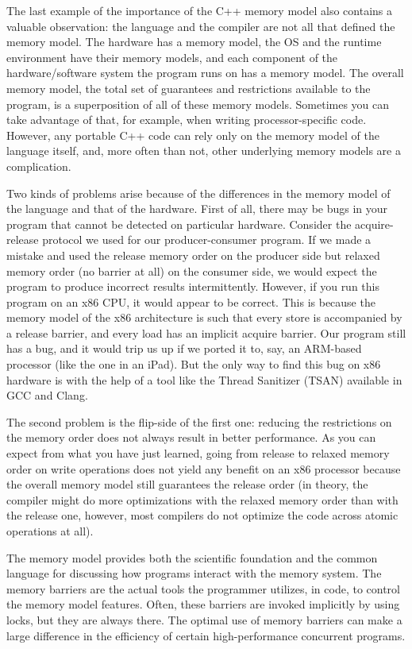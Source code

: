 The last example of the importance of the C++ memory model also contains a valuable observation: the language and the compiler are not all that defined the memory model. The hardware has a memory model, the OS and the runtime environment have their memory models, and each component of the hardware/software system the program runs on has a memory model. The overall memory model, the total set of guarantees and restrictions available to the program, is a superposition of all of these memory models. Sometimes you can take advantage of that, for example, when writing processor-specific code. However, any portable C++ code can rely only on the memory model of the language itself, and, more often than not, other underlying memory models are a complication.

Two kinds of problems arise because of the differences in the memory model of the language and that of the hardware. First of all, there may be bugs in your program that cannot be detected on particular hardware. Consider the acquire-release protocol we used for our producer-consumer program. If we made a mistake and used the release memory order on the producer side but relaxed memory order (no barrier at all) on the consumer side, we would expect the program to produce incorrect results intermittently. However, if you run this program on an x86 CPU, it would appear to be correct. This is because the memory model of the x86 architecture is such that every store is accompanied by a release barrier, and every load has an implicit acquire barrier. Our program still has a bug, and it would trip us up if we ported it to, say, an ARM-based processor (like the one in an iPad). But the only way to find this bug on x86 hardware is with the help of a tool like the Thread Sanitizer (TSAN) available in GCC and Clang.

The second problem is the flip-side of the first one: reducing the restrictions on the memory order does not always result in better performance. As you can expect from what you have just learned, going from release to relaxed memory order on write operations does not yield any benefit on an x86 processor because the overall memory model still guarantees the release order (in theory, the compiler might do more optimizations with the relaxed memory order than with the release one, however, most compilers do not optimize the code across atomic operations at all).

The memory model provides both the scientific foundation and the common language for discussing how programs interact with the memory system. The memory barriers are the actual tools the programmer utilizes, in code, to control the memory model features. Often, these barriers are invoked implicitly by using locks, but they are always there. The optimal use of memory barriers can make a large difference in the efficiency of certain high-performance concurrent programs.














